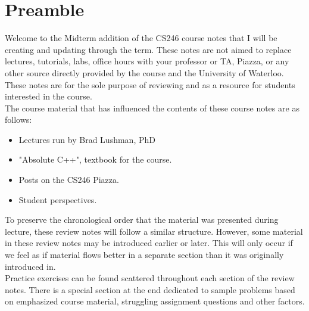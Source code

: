 \section*{Preamble}

Welcome to the Midterm addition of the CS246 course notes that I will be creating and updating through the term.  These notes are not aimed to replace lectures, tutorials, labs, office hours with your professor or TA, Piazza, or any other source directly provided by the course and the University of Waterloo.  These notes are for the sole purpose of reviewing and as a resource for students interested in the course.\\

The course material that has influenced the contents of these course notes are as follows:

\begin{itemize}

\item Lectures run by Brad Lushman, PhD
\item "Absolute C++", textbook for the course.
\item Posts on the CS246 Piazza.
\item Student perspectives.

\end{itemize}

To preserve the chronological order that the material was presented during lecture, these review notes will follow a similar structure. However, some material in these review notes may be introduced earlier or later. This will only occur if we feel as if material flows better in a separate section than it was originally introduced in.\\

Practice exercises can be found scattered throughout each section of the review notes. There is a special section at the end dedicated to sample problems based on emphasized course material, struggling assignment questions and other factors.\\